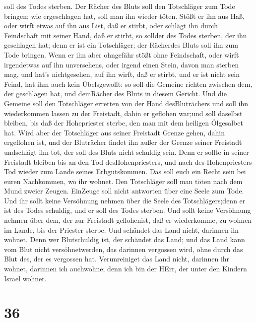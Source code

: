 soll des Todes sterben.  Der Rächer des Bluts soll den
Totschläger zum Tode bringen; wie ergeschlagen hat, soll man ihn wieder
töten.  Stößt er ihn aus Haß, oder wirft etwas auf ihn aus
List, daß er stirbt,  oder schlägt ihn durch Feindschaft
mit seiner Hand, daß er stirbt, so sollder des Todes sterben, der ihn
geschlagen hat; denn er ist ein Totschläger; der Rächerdes Bluts soll
ihn zum Tode bringen.  Wenn er ihn aber ohngefähr stößt
ohne Feindschaft, oder wirft irgendetwas auf ihn unversehens,
 oder irgend einen Stein, davon man sterben mag, und hat's
nichtgesehen, auf ihn wirft, daß er stirbt, und er ist nicht sein Feind,
hat ihm auch kein Übelsgewollt:  so soll die Gemeine
richten zwischen dem, der geschlagen hat, und demRächer des Bluts in
diesem Gericht.  Und die Gemeine soll den Totschläger
erretten von der Hand desBluträchers und soll ihn wiederkommen lassen zu
der Freistadt, dahin er geflohen war;und soll daselbst bleiben, bis daß
der Hohepriester sterbe, den man mit dem heiligen Ölgesalbet hat.
 Wird aber der Totschläger aus seiner Freistadt Grenze
gehen, dahin ergeflohen ist,  und der Bluträcher findet ihn
außer der Grenze seiner Freistadt undschlägt ihn tot, der soll des Bluts
nicht schuldig sein.  Denn er sollte in seiner Freistadt
bleiben bis an den Tod desHohenpriesters, und nach des Hohenpriesters
Tod wieder zum Lande seines Erbgutskommen.  Das soll euch
ein Recht sein bei euren Nachkommen, wo ihr wohnet.  Den
Totschläger soll man töten nach dem Mund zweier Zeugen. EinZeuge soll
nicht antworten über eine Seele zum Tode.  Und ihr sollt
keine Versöhnung nehmen über die Seele des Totschlägers;denn er ist des
Todes schuldig, und er soll des Todes sterben.  Und sollt
keine Versöhnung nehmen über dem, der zur Freistadt geflohenist, daß er
wiederkomme, zu wohnen im Lande, bis der Priester sterbe. 
Und schändet das Land nicht, darinnen ihr wohnet. Denn wer Blutschuldig
ist, der schändet das Land; und das Land kann vom Blut nicht
versöhnetwerden, das darinnen vergossen wird, ohne durch das Blut des,
der es vergossen hat.  Verunreiniget das Land nicht,
darinnen ihr wohnet, darinnen ich auchwohne; denn ich bin der HErr, der
unter den Kindern Israel wohnet.

\hypertarget{section-35}{%
\section{36}\label{section-35}}

